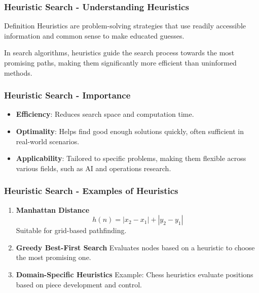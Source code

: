 \documentclass[aspectratio=169]{beamer}
\begin{document}
\begin{frame}[fragile]
    \frametitle{Heuristic Search - Understanding Heuristics}
    
    \begin{block}{Definition}
        Heuristics are problem-solving strategies that use readily accessible information and common sense to make educated guesses.
    \end{block}
    
    In search algorithms, heuristics guide the search process towards the most promising paths, making them significantly more efficient than uninformed methods.
\end{frame}

\begin{frame}[fragile]
    \frametitle{Heuristic Search - Importance}
    
    \begin{itemize}
        \item \textbf{Efficiency}: Reduces search space and computation time.
        \item \textbf{Optimality}: Helps find good enough solutions quickly, often sufficient in real-world scenarios.
        \item \textbf{Applicability}: Tailored to specific problems, making them flexible across various fields, such as AI and operations research.
    \end{itemize}
\end{frame}

\begin{frame}[fragile]
    \frametitle{Heuristic Search - Examples of Heuristics}
    
    \begin{enumerate}
        \item \textbf{Manhattan Distance}
            \begin{equation}
                h(n) = |x_2 - x_1| + |y_2 - y_1|
            \end{equation}
            Suitable for grid-based pathfinding.
            
        \item \textbf{Greedy Best-First Search}
            Evaluates nodes based on a heuristic to choose the most promising one.
            
        \item \textbf{Domain-Specific Heuristics}
            Example: Chess heuristics evaluate positions based on piece development and control.
    \end{enumerate}
\end{frame}
\end{document}
